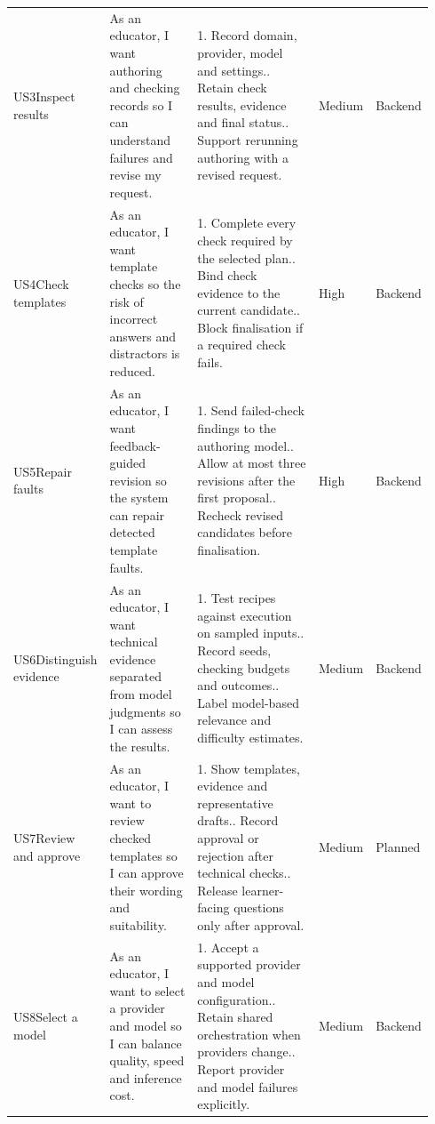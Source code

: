 \begin{landscape}
{\begin{longtable}{@{}P{0.12\linewidth}P{0.27\linewidth}P{0.42\linewidth}P{0.07\linewidth}P{0.06\linewidth}@{}}
\addlinespace[2pt]
US3\newline Inspect results & As an educator, I want authoring and checking records so I can understand failures and revise my request. & 1. Record domain, provider, model and settings.. Retain check results, evidence and final status.. Support rerunning authoring with a revised request. & Medium & Backend \\
\addlinespace[2pt]
US4\newline Check templates & As an educator, I want template checks so the risk of incorrect answers and distractors is reduced. & 1. Complete every check required by the selected plan.. Bind check evidence to the current candidate.. Block finalisation if a required check fails. & High & Backend \\
\addlinespace[2pt]
US5\newline Repair faults & As an educator, I want feedback-guided revision so the system can repair detected template faults. & 1. Send failed-check findings to the authoring model.. Allow at most three revisions after the first proposal.. Recheck revised candidates before finalisation. & High & Backend \\
\addlinespace[2pt]
US6\newline Distinguish evidence & As an educator, I want technical evidence separated from model judgments so I can assess the results. & 1. Test recipes against execution on sampled inputs.. Record seeds, checking budgets and outcomes.. Label model-based relevance and difficulty estimates. & Medium & Backend \\
\addlinespace[2pt]
US7\newline Review and approve & As an educator, I want to review checked templates so I can approve their wording and suitability. & 1. Show templates, evidence and representative drafts.. Record approval or rejection after technical checks.. Release learner-facing questions only after approval. & Medium & Planned \\
\addlinespace[2pt]
US8\newline Select a model & As an educator, I want to select a provider and model so I can balance quality, speed and inference cost. & 1. Accept a supported provider and model configuration.. Retain shared orchestration when providers change.. Report provider and model failures explicitly. & Medium & Backend \\

\end{longtable}}
\end{landscape}

